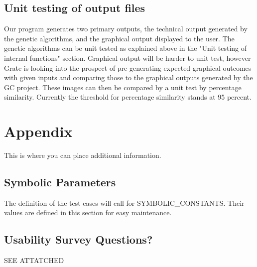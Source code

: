 \documentclass[12pt, titlepage]{article}
\begin{document}
\subsection{Unit testing of output files}		

Our program generates two primary outputs, the technical output generated by the genetic algorithms, and the graphical output displayed to the user. The genetic algorithms can be unit tested as explained above in the "Unit testing of internal functions" section. Graphical output will be harder to unit test, however Grate is looking into the prospect of pre generating expected graphical outcomes with given inputs and comparing those to the graphical outputs generated by the GC project. These images can then be compared by a unit test by percentage similarity. Currently the threshold for percentage similarity stands at 95 percent.





\newpage

\section{Appendix}

This is where you can place additional information.

\subsection{Symbolic Parameters}

The definition of the test cases will call for SYMBOLIC\_CONSTANTS.
Their values are defined in this section for easy maintenance.

\subsection{Usability Survey Questions?}

SEE ATTATCHED
\end{document}
